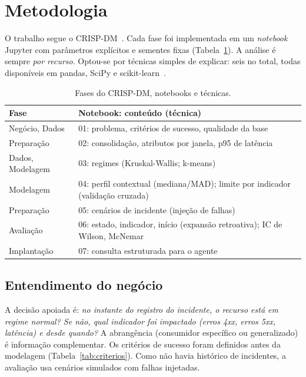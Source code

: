 \documentclass[sigconf,nonacm]{acmart}
\begin{document}
\section{Metodologia}\label{sec:metodologia}

O trabalho segue o CRISP-DM~\citep{wirth2000crispdm,chapman2000crispdm}. Cada fase foi implementada em um \emph{notebook} Jupyter com parâmetros explícitos e sementes fixas (Tabela~\ref{tab:fases}). A análise é sempre \emph{por recurso}. Optou-se por técnicas simples de explicar: seis no total, todas disponíveis em pandas, SciPy e scikit-learn~\citep{pedregosa2011sklearn}.

\begin{table}[t]
  \caption{Fases do CRISP-DM, notebooks e técnicas.}
  \label{tab:fases}
  \small
  \begin{tabular}{p{}p{}}
    \toprule
    Fase & Notebook: conteúdo (técnica) \\
    \midrule
    Negócio, Dados & 01: problema, critérios de sucesso, qualidade da base \\
    Preparação & 02: consolidação, atributos por janela, p95 de latência \\
    Dados, Modelagem & 03: regimes (Kruskal-Wallis; k-means) \\
    Modelagem & 04: perfil contextual (mediana/MAD); limite por indicador (validação cruzada) \\
    Preparação & 05: cenários de incidente (injeção de falhas) \\
    Avaliação & 06: estado, indicador, início (expansão retroativa); IC de Wilson, McNemar \\
    Implantação & 07: consulta estruturada para o agente \\
    \bottomrule
  \end{tabular}
\end{table}

\subsection{Entendimento do negócio}
A decisão apoiada é: \emph{no instante do registro do incidente, o recurso está em regime normal? Se não, qual indicador foi impactado (erros 4xx, erros 5xx, latência) e desde quando?} A abrangência (consumidor específico ou generalizado) é informação complementar. Os critérios de sucesso foram definidos antes da modelagem (Tabela~\ref{tab:criterios}). Como não havia histórico de incidentes, a avaliação usa cenários simulados com falhas injetadas.
\end{document}
